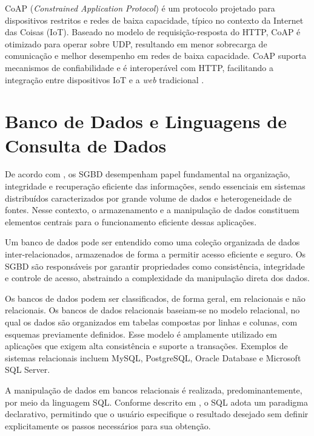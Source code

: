 \gls{CoAP} (\textit{Constrained Application Protocol}) é um protocolo projetado para dispositivos restritos e redes de baixa capacidade, típico no contexto da Internet das Coisas (\gls{IoT}). Baseado no modelo de requisição-resposta do \gls{HTTP}, \gls{CoAP} é otimizado para operar sobre \gls{UDP}, resultando em menor sobrecarga de comunicação e melhor desempenho em redes de baixa capacidade. \gls{CoAP} suporta mecanismos de confiabilidade e é interoperável com \gls{HTTP}, facilitando a integração entre dispositivos \gls{IoT} e a \textit{web} tradicional \cite{bormann2012}.

\section{Banco de Dados e Linguagens de Consulta de Dados}

De acordo com \cite{elmasri2019}, os \gls{SGBD} desempenham papel fundamental na organização, integridade e recuperação eficiente das informações, sendo essenciais em sistemas distribuídos caracterizados por grande volume de dados e heterogeneidade de fontes. Nesse contexto, o armazenamento e a manipulação de dados constituem elementos centrais para o funcionamento eficiente dessas aplicações.

Um banco de dados pode ser entendido como uma coleção organizada de dados inter-relacionados, armazenados de forma a permitir acesso eficiente e seguro. Os \gls{SGBD} são responsáveis por garantir propriedades como consistência, integridade e controle de acesso, abstraindo a complexidade da manipulação direta dos dados.

Os bancos de dados podem ser classificados, de forma geral, em relacionais e não relacionais. Os bancos de dados relacionais baseiam-se no modelo relacional, no qual os dados são organizados em tabelas compostas por linhas e colunas, com esquemas previamente definidos. Esse modelo é amplamente utilizado em aplicações que exigem alta consistência e suporte a transações. Exemplos de sistemas relacionais incluem MySQL, PostgreSQL, Oracle Database e Microsoft SQL Server.

A manipulação de dados em bancos relacionais é realizada, predominantemente, por meio da linguagem \gls{SQL}. Conforme descrito em \cite{elmasri2019}, o SQL adota um paradigma declarativo, permitindo que o usuário especifique o resultado desejado sem definir explicitamente os passos necessários para sua obtenção.


